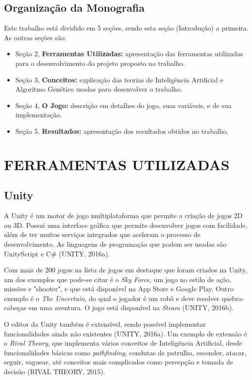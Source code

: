\documentclass[12pt,a4paper]{article}
\begin{document}
	\subsection{Organização da Monografia}
		Este trabalho está dividido em 5 seções, sendo esta seção (Introdução) a primeira. As outras seções são:
		\begin{itemize}[noitemsep]
     		\item Seção 2, \textbf{Ferramentas Utilizadas:} apresentação das ferramentas utilizadas para o desenvolvimento do projeto proposto no trabalho.
     		\item Seção 3, \textbf{Conceitos:} explicação das teorias de Inteligência Artificial e Algoritmo Genético usadas para desenvolver o trabalho.
     		\item Seção 4, \textbf{O Jogo:} descrição em detalhes do jogo, suas variáveis, e de sua implementação.
     		\item Seção 5, \textbf{Resultados:} apresentação dos resultados obtidos no trabalho.
  	 	\end{itemize}

\newpage %
\section{FERRAMENTAS UTILIZADAS}

	\subsection{Unity}
		A Unity é um motor de jogo multiplataforma que permite a criação de jogos 2D ou 3D.
		Possui uma interface gráfica que permite desenvolver jogos com facilidade,
		além de ter muitos serviços integrados que aceleram o processo de desenvolvimento.
		As linguagens de programação que podem ser usadas são UnityScript e C\#
		(UNITY, 2016a).
		
		Com mais de 200 jogos na lista de jogos em destaque que foram criados na Unity,
		um dos exemplos que pode-se citar é o \textit{Sky Force},
		um jogo no estilo de ação, missões e "shooter",
		e que está disponível na App Store e Google Play.
		Outro exemplo é o \textit{The Uncertain},
		do qual o jogador é um robô e
		deve resolver quebra-cabeças em uma aventura.
		O jogo está disponível na \textit{Steam}
		(UNITY, 2016b).
		
		O editor da Unity também é extensível, sendo possível implementar funcionalidades ainda não existentes
		(UNITY, 2016a).
		Um exemplo de extensão é o \textit{Rival Theory},
		que implementa vários conceitos de Inteligência Artificial,
		desde funcionalidades básicas como \textit{pathfinding},
		condutas de patrulha, esconder, atacar, seguir, vaguear,
		até conceitos mais complicados como percepção e tomada de decisão
		(RIVAL THEORY, 2015).
		
\end{document}

